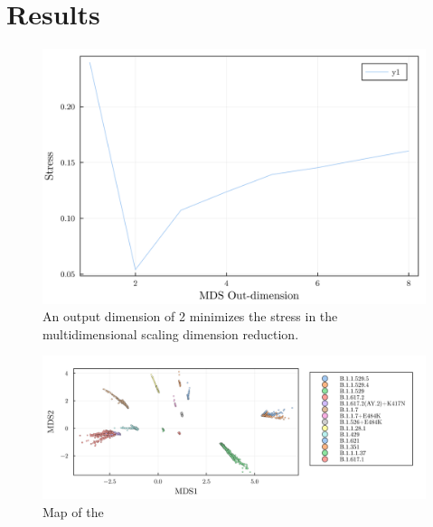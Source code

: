 \documentclass{article}
\begin{document}
\section{Results}


\begin{figure}
    \includegraphics[width=\textwidth]{../SarsEvoModel/plots/combined_mds_stress.png}    
    \caption{An output dimension of 2 minimizes the stress in the multidimensional scaling dimension reduction.}
\end{figure}%

\begin{figure}
    \includegraphics[width=\textwidth]{../SarsEvoModel/plots/homoplasy_usa/homoplasy_usa_mds_multidimensional_scaling.png}    
    \caption{Map of the } 
\end{figure}






\end{document}
